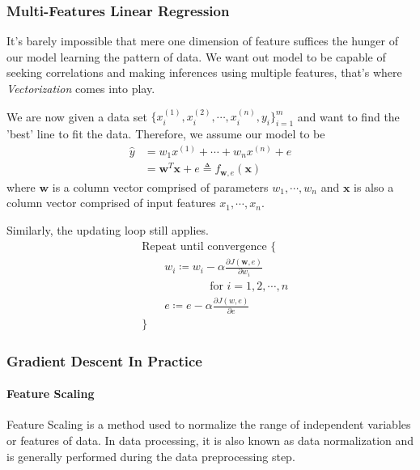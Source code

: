 \documentclass[12pt, twoside]{article}
\begin{document}
\begin{multicols*}{2}
		\subsubsection{Multi-Features Linear Regression}
		It's barely impossible that mere one dimension of feature suffices the hunger of our model learning the pattern of data. We want out model to be capable of seeking correlations and making inferences using multiple features, that's where \textit{Vectorization} comes into play.
		
		We are now given a data set $\{x_i^{(1)},x_i^{(2)},\cdots,x_i^{(n)},y_i\}_{i=1}^{m}$ and want to find the 'best' line to fit the data. Therefore, we assume our model to be
		\begin{align*}
			\hat{y} &= w_1x^{(1)}+\cdots+w_nx^{(n)}+e \\
					&= \mathbf{w}^T\mathbf{x}+e\triangleq f_{\mathbf{w},e}(\mathbf{x})
		\end{align*}
		where $\mathbf{w}$ is a column vector comprised of parameters $w_1,\cdots,w_n$ and $\mathbf{x}$ is also a column vector comprised of input features $x_1,\cdots,x_n$.
		
		Similarly, the updating loop still applies.
		\begin{align*}
			&\text{Repeat until convergence \{}\\
				&\qquad w_i\coloneq w_i-\alpha\frac{\partial J(\mathbf{w},e)}{\partial w_i} \\
				&\qquad\qquad\qquad\text{for }i=1,2,\cdots,n \\
				&\qquad e\coloneq e-\alpha\frac{\partial J(w,e)}{\partial e} \\
			&\text{\}}
		\end{align*}
		
		\subsubsection{Gradient Descent In Practice}
			\paragraph{Feature Scaling}
			Feature Scaling is a method used to normalize the range of independent variables or features of data. In data processing, it is also known as data normalization and is generally performed during the data preprocessing step.\cite{enwiki:1177060479}
			

\end{multicols*}
\end{document}
